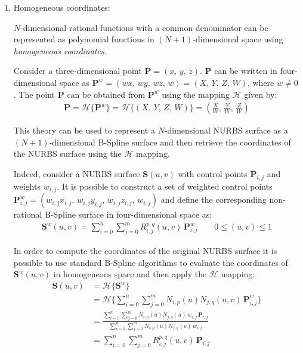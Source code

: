 \begin{enumerate}
    
    \item Homogeneous coordinates:
    
    $N$-dimensional rational functions with a common denominator can be represented as polynomial functions in $(N+1)$-dimensional space using \textit{homogeneous coordinates}.
    
    Consider a three-dimensional point $\mathbf{P}=(x,\, y,\, z)$. $\mathbf{P}$ can be written in four-dimensional space as $\mathbf{P}^w=(wx,\, wy,\, wz,\, w) = (X,\, Y,\, Z,\, W)$, where $w \neq 0$.
    The point $\mathbf{P}$ can be obtained from $\mathbf{P}^w$ using the mapping $\mathcal{H}$ given by:
    \begin{align*}
        \mathbf{P} = \mathcal{H}\{\mathbf{P}^w\} =  \mathcal{H}\{(X,\, Y,\, Z,\, W)\} = \left( \frac{X}{W},\, \frac{Y}{W},\, \frac{Z}{W}\right)
    \end{align*}
    
    This theory can be used to represent a $N$-dimensional NURBS surface as a $(N+1)$-dimensional B-Spline surface and then retrieve the coordinates of the NURBS surface using the $\mathcal{H}$ mapping.
    
    Indeed, consider a NURBS surface $\mathbf{S}(u, v)$ with control points $\mathbf{P}_{i, j}$ and weights $w_{i, j}$. It is possible to construct a set of weighted control points $\mathbf{P}^{w}_{i,j} = (w_{i,j}x_{i,j},\, w_{i,j}y_{i,j},\, w_{i,j}z_{i,j},\, w_{i,j})$ and define the corresponding non-rational B-Spline surface in four-dimensional space as:
    \begin{align*}
        \mathbf{S}^{w}(u,v)=\sum_{i=0}^{n} \sum_{j=0}^{m} R_{i,j}^{p,q}(u,v)\, \mathbf{P}^{w}_{i,j} \quad \quad 0 \leq (u,v) \leq 1
    \end{align*}
    
    In order to compute the coordinates of the original NURBS surface it is possible to use standard B-Spline algorithms to evaluate the coordinates of $\mathbf{S}^{w}(u,v)$ in homogeneous space and then apply the $\mathcal{H}$ mapping:
    \begin{align*}
        \mathbf{S}(u,v) &= \mathcal{H}\{\mathbf{S}^w\} \\
        &=  \mathcal{H} \bigg\{\sum_{i=0}^{n} \sum_{j=0}^{m} N_{i,p}(u)N_{j,q}(u,v)\, \mathbf{P}^{w}_{i,j} \bigg\}  \\
        &= \frac{\sum\limits_{i=0}^{n} \sum\limits_{j=0}^{m} N_{i,p}(u)N_{j,q}(u)\, w_{i,j} \,\mathbf{P}_{i,j}}{\sum\limits_{i=0}^{n} \sum\limits_{j=0}^{m} N_{i,p}(u)N_{j,q}(v)\, w_{i,j}} \\
        &= \sum_{i=0}^{n}\sum_{j=0}^{m} R_{i,j}^{p,q}(u,v) \, \mathbf{P}_{i,j}
    \end{align*}
    

\end{enumerate}
